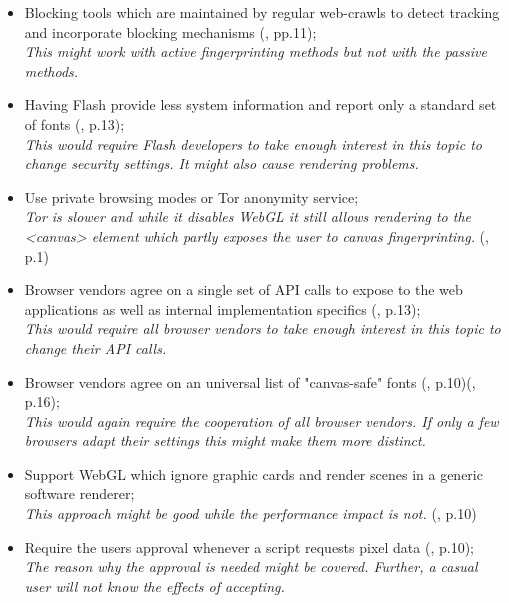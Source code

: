 \begin{itemize}
	\item Blocking tools which are maintained by regular web-crawls to detect tracking and incorporate blocking mechanisms (\textcite{acar14}, pp.11);\\
	\textit{This might work with active fingerprinting methods but not with the passive methods.}

	\item Having Flash provide less system information and report only a standard set of fonts (\textcite{nikiforakis13}, p.13);\\
	\textit{This would require Flash developers to take enough interest in this topic to change security settings. It might also cause rendering problems.} 
	
	\item Use private browsing modes or Tor anonymity service;\\
	\textit{Tor is slower and while it disables WebGL it still allows rendering to the <canvas> element which partly exposes the user to canvas fingerprinting.} (\textcite{mowery12}, p.1)
	
	\item Browser vendors agree on a single set of API calls to expose to the web applications as well as internal implementation specifics (\textcite{nikiforakis13}, p.13);\\
	\textit{This would require all browser vendors to take enough interest in this topic to change their API calls.}
	
	\item Browser vendors agree on an universal list of "canvas-safe" fonts (\textcite{mowery12}, p.10)(\textcite{boda11}, p.16);\\
	\textit{This would again require the cooperation of all browser vendors. If only a few browsers adapt their settings this might make them more distinct.} 
	
	\item Support WebGL which ignore graphic cards and render scenes in a generic software renderer;\\
	\textit{This approach might be good while the performance impact is not.} (\textcite{mowery12}, p.10)
	
	\item Require the users approval whenever a script requests pixel data (\textcite{mowery12}, p.10);\\
	\textit{The reason why the approval is needed might be covered. Further, a casual user will not know the effects of accepting.}
	

\end{itemize}
